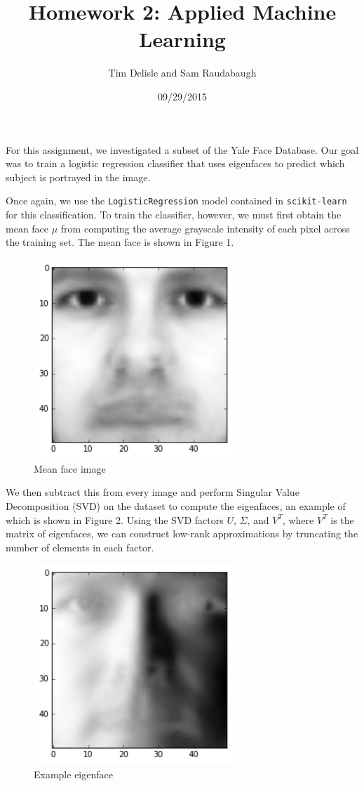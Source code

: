 \documentclass[12pt]{report}
\begin{document}
\lstset{language=Python}

\title{Homework 2: Applied Machine Learning}
\author{Tim Delisle and Sam Raudabaugh}
\date{09/29/2015}
\maketitle


For this assignment, we investigated a subset of the Yale Face Database. Our goal was to
train a logistic regression classifier that uses eigenfaces to predict which subject is
portrayed in the image.

Once again, we use the \verb+LogisticRegression+ model contained in \verb+scikit-learn+
for this classification. To train the classifier, however, we must first obtain the mean face
$\mu$ from computing the average grayscale intensity of each pixel across the training set.
The mean face is shown in Figure 1.

\begin{figure}
\centering
  \includegraphics[width=75mm]{figures/mean.png}
\caption{Mean face image}
\end{figure}

We then subtract this from every image and perform Singular Value Decomposition (SVD) on the
dataset to compute the eigenfaces, an example of which is shown in Figure 2. Using the SVD
factors $U$, $\Sigma$, and $V^T$, where $V^T$ is the matrix of eigenfaces, we can construct
low-rank approximations by truncating the number of elements in each factor.

\begin{figure}
\centering
  \includegraphics[width=75mm]{figures/eigen.png}
\caption{Example eigenface}
\end{figure}
\end{document}
